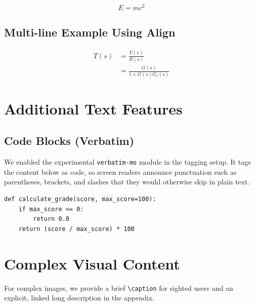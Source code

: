 \documentclass[11pt]{article}
\begin{document}
\begin{equation}
    E = mc^2
    \label{eq:einstein}
\end{equation}

\subsection{Multi-line Example Using Align}
\begin{align}
  T(s) &= \frac{Y(s)}{R(s)} \\
       &= \frac{G(s)}{1 + G(s)G_c(s)}
\end{align}

\section{Additional Text Features}

\subsection{Code Blocks (Verbatim)}
We enabled the experimental \texttt{verbatim-mo} module in the tagging setup. It tags the content below as code, so screen readers announce punctuation such as parentheses, brackets, and slashes that they would otherwise skip in plain text.

\begin{verbatim}
def calculate_grade(score, max_score=100):
    if max_score <= 0:
        return 0.0
    return (score / max_score) * 100
\end{verbatim}


\section{Complex Visual Content}

For complex images, we provide a brief \verb|\caption| for sighted users and an explicit, linked long description in the appendix.

\end{document}
